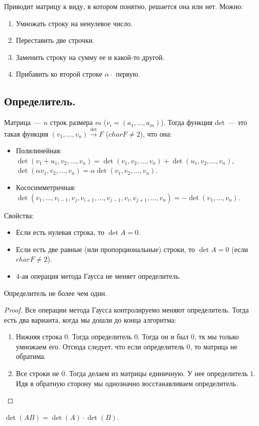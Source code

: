 \documentclass{article}
\begin{document}
	\begin{method}[Гаусса]
		Приводит матрицу к виду, в котором понятно, решается она или нет. Можно:
		\begin{enumerate}
			\item Умножать строку на ненулевое число.
			\item Переставить две строчки.
			\item Заменить строку на сумму ее и какой-то другой.
			\item Прибавить ко второй строке $\alpha \cdot$ первую.
		\end{enumerate}
	\end{method}
	\subsection{Определитель.}
	\begin{definition}
		Матрица~--- $n$ строк размера $m$ ($v_i = (a_1, \dots, a_m)$). Тогда функция det~--- это такая функция $(v_1, \dots, v_n) \xrightarrow{\det} F$ ($char F \not= 2$), что она:
		\begin{itemize}
			\item Полилинейная: $\det(v_1 + u_1, v_2, \dots, v_n) = \det(v_1, v_2, \dots, v_n) + \det(u_1, v_2, \dots, v_n)$, $\det(\alpha v_1, v_2, \dots, v_n) = \alpha \det(v_1, v_2, \dots, v_n)$.
			\item Кососимметричная: $\det(v_1, \dots, v_{i - 1}, v_j, v_{i + 1}, \dots, v_{j - 1}, v_i, v_{j + 1}, \dots, v_n) = -\det(v_1, \dots, v_n)$.
		\end{itemize}
	\end{definition}
	\noindent
	Свойства:
	\begin{itemize}
		\item Если есть нулевая строка, то $\det A = 0$.
		\item Если есть две равные (или пропорциональные) строки, то $\det A = 0$ (если $char F \not= 2$).
		\item $4$-ая операция метода Гаусса не меняет определитель.
	\end{itemize}
	\begin{statement}
		Определитель не более чем один.
	\end{statement}
	\begin{proof}
		Все операции метода Гаусса контролируемо меняют определитель. Тогда есть два варианта, когда мы дошли до конца алгоритма:
		\begin{enumerate}
			\item Нижняя строка $0$. Тогда определитель $0$. Тогда он и был $0$, тк мы только умножаем его. Отсюда следует, что если определитель $0$, то матрица не обратима.
			\item Все строки не $0$. Тогда делаем из матрицы единичную. У нее определитель $1$. Идя в обратную сторону мы однозначно восстанавливаем определитель.
		\end{enumerate}
	\end{proof}
	\begin{statement}
		$\det(AB) = \det(A) \cdot \det(B)$.
	\end{statement}
\end{document}
